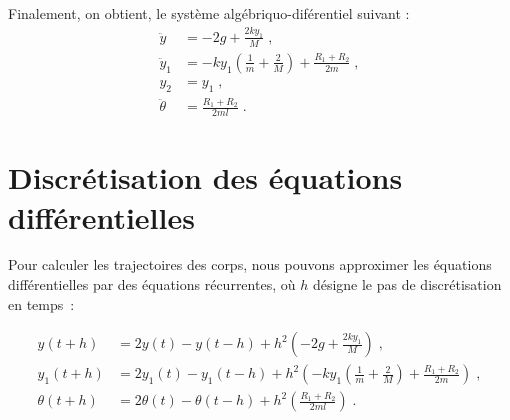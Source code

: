 \documentclass[a4paper,11pt]{amsart}
\begin{document}
Finalement, on obtient, le syst\`eme alg\'ebriquo-dif\'erentiel suivant :
\begin{align*}
\ddot{y} &=-2g+\frac{2ky_1}{M}\;,\\
\ddot{y}_1 &= -ky_1(\frac{1}{m}+\frac{2}{M})+\frac{R_1+R_2}{2m}\;,\\
y_2 &= y_1\;,\\
\ddot{\theta} &= \frac{R_1+R_2}{2ml}\;.
\end{align*}



\section{Discr\'etisation des \'equations diff\'erentielles}
Pour calculer les trajectoires des corps, nous pouvons approximer
les \'equations diff\'erentielles par des
\'equations r\'ecurrentes, o\`u $h$ d\'esigne le pas de discr\'etisation en temps~:

\begin{align*}
y(t+h) &=2y(t)-y(t-h)+h^2\left(-2g+\frac{2ky_1}{M}\right)\;,\\
y_1(t+h) &=2y_1(t)-y_1(t-h)+h^2\left(-ky_1(\frac{1}{m}+\frac{2}{M})+\frac{R_1+R_2}{2m}\right)\;,\\
\theta(t+h) &=2\theta(t)-\theta(t-h)+h^2\left(\frac{R_1+R_2}{2ml}\right)\;.
\end{align*}
\end{document}
